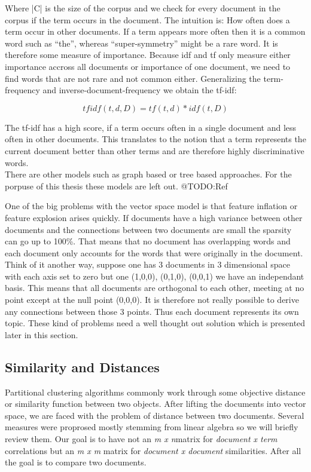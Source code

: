     Where |C| is the size of the corpus and we check for every document in the corpus if the term occurs in the document. The intuition is: How often does a term occur in other documents. If a term appears more often then it is a common word such as ``the'', whereas ``super-symmetry'' might be a rare word. It is therefore some measure of importance. Because idf and tf only measure either importance accross all documents or importance of one document, we need to find words that are not rare and not common either. Generalizing the term-frequency and inverse-document-frequency we obtain the tf-idf:

    \begin{equation}
      tfidf(t, d, D) = tf(t, d) * idf(t, D)
    \end{equation}

    The tf-idf has a high score, if a term occurs often in a single document and less often in other documents. This translates to the notion that a term represents the current document better than other terms and are therefore highly discriminative words.\\

    There are other models such as graph based or tree based approaches. For the porpuse of this thesis these models are left out. @TODO:Ref

    One of the big problems with the vector space model is that feature inflation or feature explosion arises quickly. If documents have a high variance between other documents and the connections between two documents are small the sparsity can go up to 100\%. That means that no document has overlapping words and each document only accounts for the words that were originally in the document. Think of it another way, suppose one has 3 documents in 3 dimensional space with each axis set to zero but one (1,0,0), (0,1,0), (0,0,1) we have an independant basis. This means that all documents are orthogonal to each other, meeting at no point except at the null point (0,0,0). It is therefore not really possible to derive any connections between those 3 points. Thus each document represents its own topic.
    These kind of problems need a well thought out solution which is presented later in this section.

  \subsection{Similarity and Distances}
    Partitional clustering algorithms commonly work through some objective distance or similarity function between two objects. After lifting the documents into vector space, we are faced with the problem of distance between two documents. Several measures were proprosed mostly stemming from linear algebra so we will briefly review them. Our goal is to have not an \emph{m x n}matrix for \emph{document x term} correlations but an \emph{m x m} matrix for \emph{document x document} similarities. After all the goal is to compare two documents.

